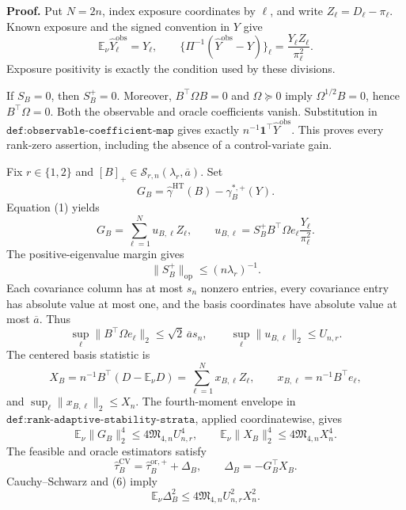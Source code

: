 \textbf{Proof.}
Put \(N=2n\), index exposure coordinates by \(\ell\), and write \(Z_\ell=D_\ell-\pi_\ell\).  Known exposure and the signed convention in \(Y\) give
\[
\mathbb E_\nu\widehat Y_\ell^{\mathrm{obs}}=Y_\ell,
\qquad
\{\Pi^{-1}(\widehat Y^{\mathrm{obs}}-Y)\}_\ell
=\frac{Y_\ell Z_\ell}{\pi_\ell^2}.
\tag{1}
\]
Exposure positivity is exactly the condition used by these divisions.

If \(S_B=0\), then \(S_B^+=0\).  Moreover, \(B^\top\Omega B=0\) and \(\Omega\succeq0\) imply \(\Omega^{1/2}B=0\), hence \(B^\top\Omega=0\).  Both the observable and oracle coefficients vanish.  Substitution in \(\texttt{def:observable-coefficient-map}\) gives exactly \(n^{-1}\mathbf1^\top\widehat Y^{\mathrm{obs}}\).  This proves every rank-zero assertion, including the absence of a control-variate gain.

Fix \(r\in\{1,2\}\) and \([B]_+\in\mathcal S_{r,n}(\lambda_r,\overline a)\).  Set
\[
G_B=\widehat\gamma^{\mathrm{HT}}(B)-\gamma_B^{*,+}(Y).
\]
Equation (1) yields
\[
G_B=\sum_{\ell=1}^{N}u_{B,\ell}Z_\ell,
\qquad
u_{B,\ell}=S_B^+B^\top\Omega e_\ell\frac{Y_\ell}{\pi_\ell^2}.
\tag{2}
\]
The positive-eigenvalue margin gives
\[
\lVert S_B^+\rVert_{\mathrm{op}}\le(n\lambda_r)^{-1}.
\tag{3}
\]
Each covariance column has at most \(s_n\) nonzero entries, every covariance entry has absolute value at most one, and the basis coordinates have absolute value at most \(\overline a\).  Thus
\[
\sup_\ell\lVert B^\top\Omega e_\ell\rVert_2
\le\sqrt2\,\overline a s_n,
\qquad
\sup_\ell\lVert u_{B,\ell}\rVert_2\le U_{n,r}.
\tag{4}
\]
The centered basis statistic is
\[
X_B=n^{-1}B^\top(D-\mathbb E_\nu D)
=\sum_{\ell=1}^{N}x_{B,\ell}Z_\ell,
\qquad
x_{B,\ell}=n^{-1}B^\top e_\ell,
\tag{5}
\]
and \(\sup_\ell\lVert x_{B,\ell}\rVert_2\le X_n\).  The fourth-moment envelope in \(\texttt{def:rank-adaptive-stability-strata}\), applied coordinatewise, gives
\[
\mathbb E_\nu\lVert G_B\rVert_2^4
\le4\mathfrak M_{4,n}U_{n,r}^4,
\qquad
\mathbb E_\nu\lVert X_B\rVert_2^4
\le4\mathfrak M_{4,n}X_n^4.
\tag{6}
\]
The feasible and oracle estimators satisfy
\[
\widehat\tau_B^{\mathrm{CV}}
=\widehat\tau_B^{\mathrm{or},+}+\Delta_B,
\qquad
\Delta_B=-G_B^\top X_B.
\tag{7}
\]
Cauchy--Schwarz and (6) imply
\[
\mathbb E_\nu\Delta_B^2
\le4\mathfrak M_{4,n}U_{n,r}^2X_n^2.
\tag{8}
\]

